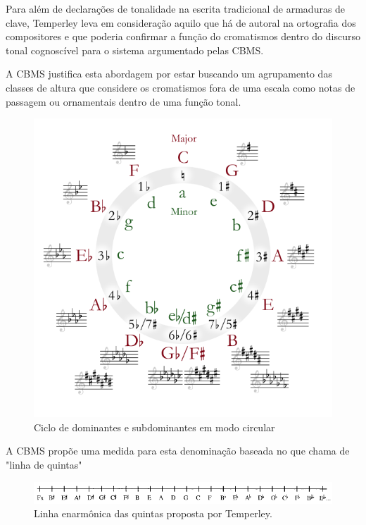 \documentclass[
	12pt,				%
	openright,			%
	twoside,			%
	a4paper,			%
	english,			%
	french,				%
	spanish,			%
	brazil				%
	]{abntex2}
\begin{document}
Para além de declarações de tonalidade na escrita tradicional de armaduras de clave, Temperley leva em consideração aquilo que há de autoral na ortografia\cite[p.123]{temperley2004cognition}  dos compositores e que poderia confirmar a função do cromatismos dentro do discurso tonal cognoscível para o sistema argumentado pelas CBMS.

A CBMS justifica esta abordagem por estar buscando um agrupamento das classes de altura que considere os cromatismos fora de uma escala como notas de passagem ou ornamentais dentro de uma função tonal.

\begin{figure}[!h]
	\caption{\label{fig_grafico}Ciclo de dominantes e subdominantes em modo circular }
	\begin{center}
	    \includegraphics[scale=0.4]{CBMS/quintas.png}
	\end{center}
\end{figure}


A CBMS propõe uma medida para esta denominação baseada no que chama de "linha de quintas"

\begin{figure}[!h]
	\caption{\label{fig_grafico}Linha enarmônica das quintas proposta por Temperley. }
	\begin{center}
	    \includegraphics[scale=0.6]{CBMS/line_fifhts-p136.png}
	\end{center}
\end{figure}
\end{document}

